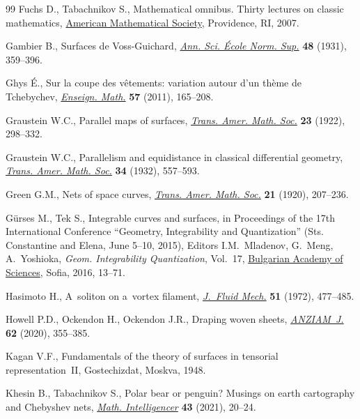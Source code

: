 \documentclass[pdftex]{sigma}
\numberwithin{equation}{section}
\begin{document}
\begin{thebibliography}{99}
Fuchs D., Tabachnikov S., Mathematical omnibus. Thirty lectures on classic
  mathematics, \href{https://doi.org/10.1090/mbk/046}{American Mathematical Society}, Providence, RI, 2007.

Gambier B., Surfaces de {V}oss-{G}uichard, \href{https://doi.org/10.24033/asens.813}{\textit{Ann. Sci. \'Ecole Norm.
  Sup.}} \textbf{48} (1931), 359--396.

Ghys \'E., Sur la coupe des v\^etements: variation autour d'un th\`eme de
  {T}chebychev, \href{https://doi.org/10.4171/LEM/57-1-8}{\textit{Enseign. Math.}} \textbf{57} (2011), 165--208.

Graustein W.C., Parallel maps of surfaces, \href{https://doi.org/10.2307/1988813}{\textit{Trans. Amer. Math. Soc.}}
  \textbf{23} (1922), 298--332.

Graustein W.C., Parallelism and equidistance in classical differential
  geometry, \href{https://doi.org/10.2307/1989367}{\textit{Trans. Amer. Math. Soc.}} \textbf{34} (1932), 557--593.

Green G.M., Nets of space curves, \href{https://doi.org/10.2307/1988903}{\textit{Trans. Amer. Math. Soc.}} \textbf{21}
  (1920), 207--236.

G\"urses M., Tek S., Integrable curves and surfaces,
in Proceedings of the 17th International Conference
``Geometry, Integrability and Quantization'' (Sts. Constantine and Elena, June 5--10, 2015), Editors I.M.~Mladenov,
G.~Meng, A.~Yoshioka, \textit{Geom. Integrability Quantization}, Vol.~17,
  \href{https://doi.org/10.7546/giq-17-2016-13-71}{Bulgarian Academy of Sciences}, Sofia, 2016, 13--71.

Hasimoto H., A~soliton on a~vortex filament, \href{https://doi.org/10.1017/S0022112072002307}{\textit{J.~Fluid Mech.}}
  \textbf{51} (1972), 477--485.

Howell P.D., Ockendon H., Ockendon J.R., Draping woven sheets,
  \href{https://doi.org/10.1017/S144618112000019X}{\textit{ANZIAM~J.}} \textbf{62} (2020), 355--385.

Kagan V.F., Fundamentals of the theory of surfaces in tensorial
  representation~{II}, Gostechizdat, Moskva, 1948.

Khesin B., Tabachnikov S., Polar bear or penguin? {M}usings on earth
  cartography and {C}hebyshev nets, \href{https://doi.org/10.1007/s00283-020-10013-1}{\textit{Math. Intelligencer}} \textbf{43}
  (2021), 20--24.


\end{thebibliography}
\end{document}
